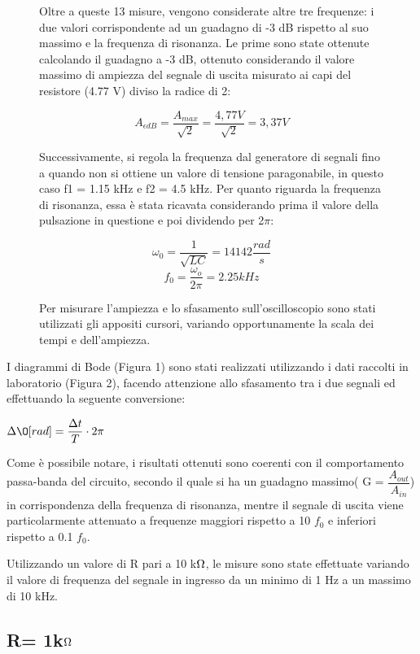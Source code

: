 \begin{figure}[ht]
\begin{minipage}{0.5\textwidth}
Oltre a queste 13 misure, vengono
considerate altre tre frequenze: i due valori corrispondente ad un guadagno di -3 dB rispetto al suo massimo
e la frequenza di risonanza. Le prime sono state ottenute calcolando il guadagno a -3 dB, ottenuto
considerando il valore massimo di ampiezza del segnale di uscita misurato ai capi del resistore (4.77 V) diviso
la radice di 2:

$$A_{\epsilon dB} = \dfrac{A_{max}}{\sqrt{2}}=\dfrac{4,77V}{\sqrt{2}}=3,37V$$

Successivamente, si regola la frequenza dal generatore di segnali fino a quando non si ottiene un valore di
tensione paragonabile, in questo caso f1 = 1.15 kHz e f2 = 4.5 kHz.
Per quanto riguarda la frequenza di risonanza, essa è stata ricavata considerando prima il valore della
pulsazione in questione e poi dividendo per 2$\pi$:

$$\omega_0=\dfrac{1}{\sqrt{LC}}=14142\dfrac{rad}{s}$$
$$f_0=\dfrac{\omega_o}{2\pi}=2.25kHz$$

Per misurare l’ampiezza e lo sfasamento sull’oscilloscopio sono stati utilizzati gli appositi cursori, variando
opportunamente la scala dei tempi e dell’ampiezza.

 \end{minipage}
\end{figure}

I diagrammi di Bode (Figura 1) sono stati realizzati utilizzando i dati raccolti in laboratorio (Figura 2), facendo
attenzione allo sfasamento tra i due segnali ed effettuando la seguente conversione:
\begin{center}
    

$\Delta\O[rad]=\dfrac{\Delta t}{T}\cdot 2\pi$
\end{center}
Come è possibile notare, i risultati ottenuti sono coerenti con il comportamento passa-banda del circuito,
secondo il quale si ha un guadagno massimo( G = $\dfrac{A_{out}}{A_{in}}$) in corrispondenza della frequenza di risonanza,
mentre il segnale di uscita viene particolarmente attenuato a frequenze maggiori rispetto a 10 $f_0$ e inferiori rispetto a 0.1 $f_0$.

Utilizzando un valore di R pari a 10 k$\ohm$, le misure sono state effettuate variando il valore di frequenza del
segnale in ingresso da un minimo di 1 Hz a un massimo di 10 kHz.

\subsection{R= 1k$\ohm$}



